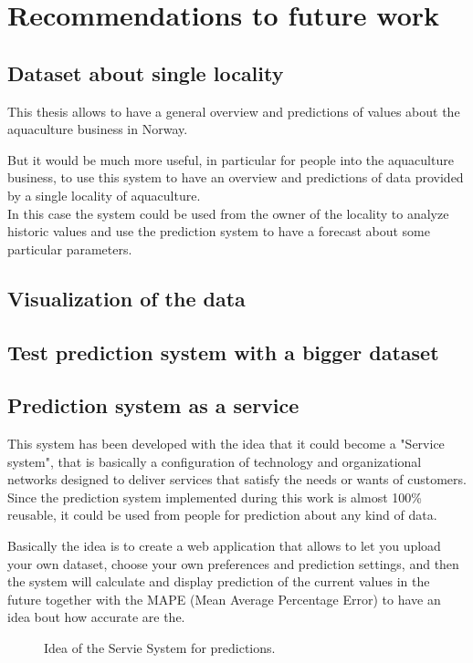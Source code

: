 
\chapter{Recommendations to future work}
\section{Dataset about single locality}
This thesis allows to have a general overview and predictions of values about the aquaculture business in Norway. 

But it would be much more useful, in particular for people into the aquaculture business, to use this system to have an overview and predictions of data provided by a single locality of aquaculture.\\
In this case the system could be used from the owner of the locality to analyze historic values and use the prediction system to have a forecast about some particular parameters.

\section{Visualization of the data}

\section{Test prediction system with a bigger dataset}

\newpage

\section{Prediction system as a service}
This system has been developed with the idea that it could become a "Service system", that is basically a configuration of technology and organizational networks designed to deliver services that satisfy the needs or wants of customers.
Since the prediction system implemented during this work is almost 100\% reusable, it could be used from people for prediction about any kind of data. 

Basically the idea is to create a web application that allows to let you upload your own dataset, choose your own preferences and prediction settings, and then the system will calculate and display prediction of the current values in the future together with the MAPE (Mean Average Percentage Error) to have an idea bout how accurate are the.\\


\begin{figure}[H]
	\centering
    \caption{Idea of the Servie System for predictions.}
\end{figure}






